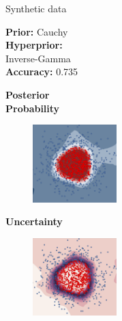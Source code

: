 \documentclass{beamer}
\begin{document}
\begin{frame}{Synthetic data}
	\begin{minipage}[t]{0.32\columnwidth}
	\vspace{0.9cm}
	\textbf{Prior:} Cauchy\\
	\textbf{Hyperprior:} \\Inverse-Gamma\\
	\textbf{Accuracy:} 0.735
	\end{minipage}
	\begin{minipage}[t]{0.32\columnwidth}
		\centering 
		\textbf{Posterior}\\\textbf{Probability}
		\vspace{-0.3cm}
		\begin{figure}
			\includegraphics[height=3cm]{pres_pics/circles_inv_cauchy_ppm.png}
		\end{figure}
	\end{minipage}
	\begin{minipage}[t]{0.32\columnwidth}
		\centering
		\vspace{0.06cm}
		\textbf{Uncertainty}
		\vspace{-0.15cm}
		\begin{figure}
			\includegraphics[height=3cm]{pres_pics/circles_inv_cauchy_uncert.png}
		\end{figure}
	\end{minipage}

\vfill


\end{frame}
\end{document}
